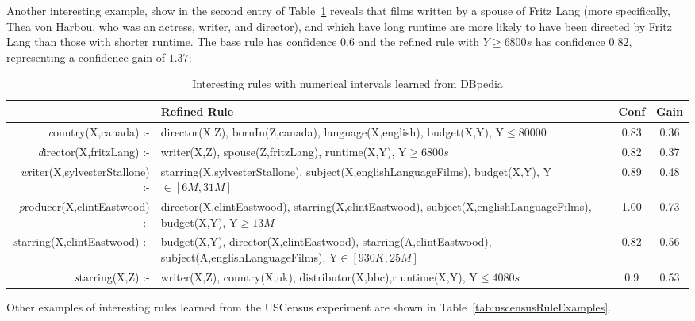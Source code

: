Another interesting example, show  in the second entry of Table~\ref{tab:mdbRuleExamples} reveals that films written by
a spouse of Fritz Lang (more specifically, Thea von Harbou, who was an actress, writer, and director), and which have
long runtime are more likely to have been directed by Fritz Lang than those with shorter runtime. The base rule has
confidence $0.6$ and the refined rule with $Y\geq 6800s$ has confidence $0.82$, representing a confidence gain of
$1.37$:

\begin{table}[h!]
 \begin{center}
 \caption{Interesting rules with numerical intervals learned from DBpedia}
  \begin{tabular}{ >{\emph}r >{\raggedright}p{7cm} | c | c }
    \toprule
      & Refined Rule				& Conf 	& Gain \\
    \midrule
      country(X,canada) :-&director(X,Z), bornIn(Z,canada), language(X,english), budget(X,Y), Y$\leq 80000$ &
      0.83	& 0.36 \\ \hline
      director(X,fritzLang) :-&writer(X,Z), spouse(Z,fritzLang), runtime(X,Y), Y$\geq 6800s$ & 
      0.82	& 0.37 \\ \hline
      writer(X,sylvesterStallone) :-&starring(X,sylvesterStallone), subject(X,englishLanguageFilms),
      budget(X,Y), Y$\in [6M,31M]$ &
      0.89	& 0.48 \\ \hline
      producer(X,clintEastwood) :-&director(X,clintEastwood), starring(X,clintEastwood),
      subject(X,englishLanguageFilms), budget(X,Y), Y$\geq 13M$ &
      1.00	& 0.73 \\ \hline
      starring(X,clintEastwood) :- &budget(X,Y), director(X,clintEastwood), starring(A,clintEastwood), 
      subject(A,englishLanguageFilms), Y$\in [930K,25M]$&
      0.82	& 0.56 \\ \hline
      starring(X,Z) :-&writer(X,Z), country(X,uk), distributor(X,bbc),r untime(X,Y), Y$\leq 4080s$ &
      0.9	& 0.53 \\ \hline

    \bottomrule
  \end{tabular}
  \label{tab:mdbRuleExamples}
 \end{center}
\end{table}

Other examples of interesting rules learned from the USCensus experiment are shown in
Table~\ref{tab:uscensusRuleExamples}.

